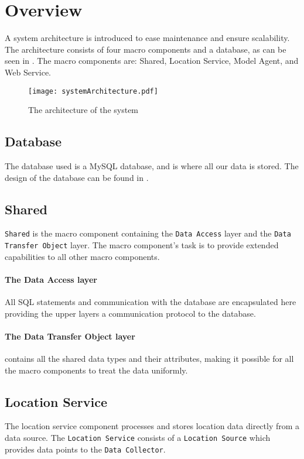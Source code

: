 \section{Overview}
A system architecture is introduced to ease maintenance and ensure scalability.
The architecture consists of four macro components and a database, as can be seen in . The macro components are: Shared, Location Service, Model Agent, and Web Service.

\begin{figure}[H]
\texttt{[image: systemArchitecture.pdf]}
\caption{The architecture of the system}
\label{fig:architecture}
\end{figure}

\subsection{Database} The database used is a MySQL database, and is where all our data is stored.
The design of the database can be found in .


\subsection{Shared}\texttt{Shared} is the macro component containing the \texttt{Data Access} layer and the \texttt{Data Transfer Object} layer.
The macro component's task is to provide extended capabilities to all other macro components.

\paragraph{The Data Access layer} All SQL statements and communication with the database are encapsulated here providing the upper layers a communication protocol to the database.

\paragraph{The Data Transfer Object layer} contains all the shared data types and their attributes, making it possible for all the macro components to treat the data uniformly.


\subsection{Location Service} 
The location service component processes and stores location data directly from a data source. 
The \texttt{Location Service} consists of a \texttt{Location Source} which provides data points to the \texttt{Data Collector}.

